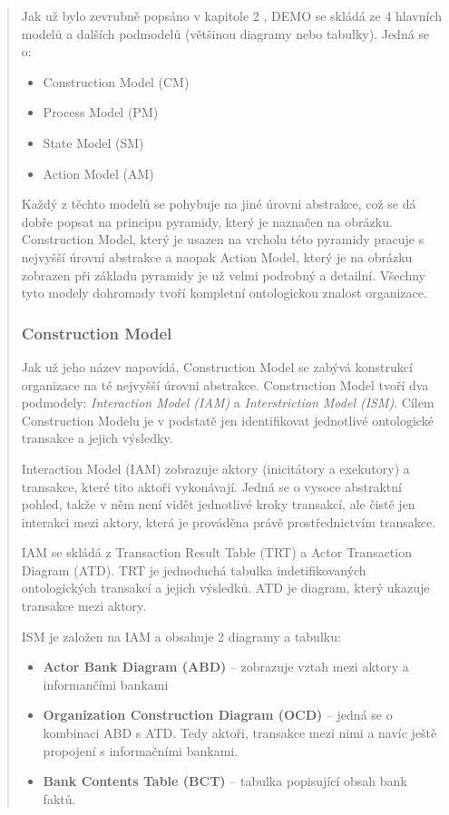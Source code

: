 \documentclass[]{article}
\begin{document}
\begin{quote}
Jak už bylo zevrubně popsáno v kapitole 2 %
, DEMO se skládá ze 4 hlavních modelů a dalších podmodelů (většinou diagramy nebo tabulky). Jedná se o:

\begin{itemize}
\item Construction Model (CM)
\item Process Model (PM)
\item State Model (SM)
\item Action Model (AM)
\end{itemize}

Každý z těchto modelů se pohybuje na jiné úrovni abstrakce, což se dá dobře popsat na principu pyramidy, který je naznačen na obrázku. %
Construction Model, který je usazen na vrcholu této pyramidy pracuje s nejvyšší úrovní abstrakce a naopak Action Model, který je na obrázku zobrazen při základu pyramidy je už velmi podrobný a detailní. Všechny tyto modely dohromady tvoří kompletní ontologickou znalost organizace.

\subsubsection{Construction Model}
Jak už jeho název napovídá, Construction Model se zabývá konstrukcí organizace na té nejvyšší úrovni abstrakce. Construction Model tvoří dva podmodely: \textit{Interaction Model (IAM)} a \textit{Interstriction Model (ISM)}. Cílem Construction Modelu je v podstatě jen identifikovat jednotlivé ontologické transakce a jejich výsledky. 

Interaction Model (IAM) zobrazuje aktory (inicitátory a exekutory) a transakce, které tito aktoři vykonávají. Jedná se o vysoce abstraktní pohled, takže v něm není vidět jednotlivé kroky transakcí, ale čistě jen interakci mezi aktory, která je prováděna právě prostřednictvím transakce.

IAM se skládá z Transaction Result Table (TRT) a Actor Transaction Diagram (ATD). TRT je jednoduchá tabulka indetifikovaných ontologických transakcí a jejich výsledků. ATD je diagram, který ukazuje transakce mezi aktory.

ISM je založen na IAM a obsahuje 2 diagramy a tabulku:

\begin{itemize}
\item \textbf{Actor Bank Diagram (ABD)} – zobrazuje vztah mezi aktory a informančími bankami
\item \textbf{Organization Construction Diagram (OCD)} – jedná se o kombinaci ABD s ATD. Tedy aktoři, transakce mezi nimi a navíc ještě propojení s informačními bankami.
\item \textbf{Bank Contents Table (BCT)} – tabulka popisující obsah bank faktů.
\end{itemize}


\end{quote}
\end{document}
